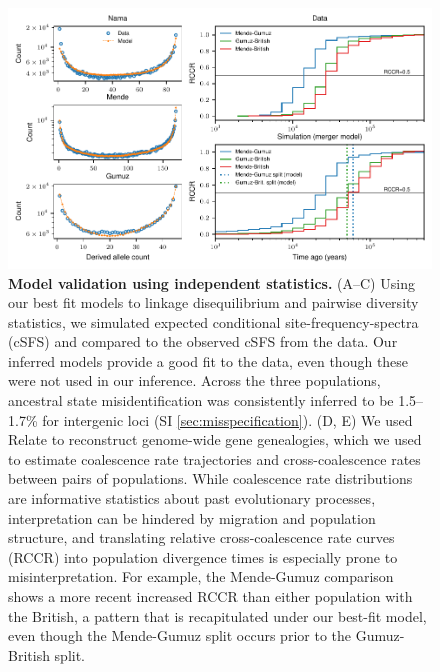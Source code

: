 \documentclass[]{article}
\begin{document}
\begin{figure}[t!]
    \centering
    \includegraphics{figures/validation}
    \caption{
        \textbf{Model validation using independent statistics.} (A--C) Using
        our best fit models to linkage disequilibrium and pairwise diversity statistics,
        we simulated expected conditional site-frequency-spectra (cSFS) and
        compared to the observed cSFS from the data. Our inferred models
        provide a good fit to the data, even though these were not used in our
        inference. Across the three populations, ancestral state
        misidentification was consistently inferred to be 1.5--1.7\% for
        intergenic loci (SI \ref{sec:misspecification}). (D, E) We used Relate
        \citep{Speidel2019-nj} to reconstruct genome-wide gene genealogies,
        which we used to estimate coalescence rate trajectories
        and cross-coalescence rates between pairs of populations. While
        coalescence rate distributions are informative statistics about past
        evolutionary processes, interpretation can be hindered by migration and
        population structure, and translating relative cross-coalescence rate
        curves (RCCR) into population divergence times is especially prone
        to misinterpretation. For example, the Mende-Gumuz comparison shows
        a more recent increased RCCR than either population with the British,
        a pattern that is recapitulated under our best-fit model, even though
        the Mende-Gumuz split occurs prior to the Gumuz-British split.
    }
    \label{fig:validation}
\end{figure}
\end{document}
